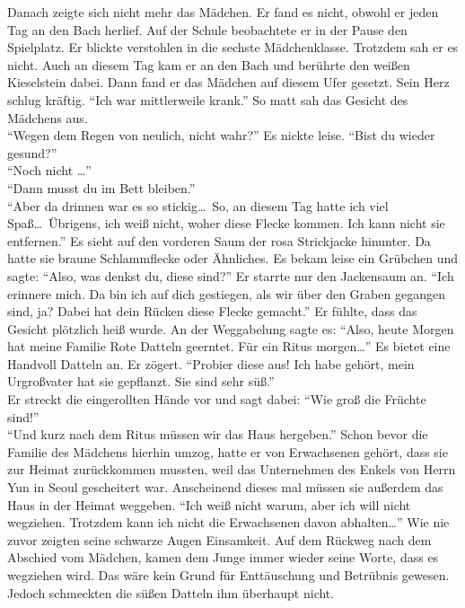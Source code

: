 \documentclass[prd,12pt,tightenlines,notitlepage,nofootinbib]{revtex4-1}
\begin{document}
Danach zeigte sich nicht mehr das Mädchen.
Er fand es nicht, obwohl er jeden Tag an den Bach herlief.
Auf der Schule beobachtete er in der Pause den Spielplatz.
Er blickte verstohlen in die sechste Mädchenklasse.
Trotzdem sah er es nicht.
Auch an diesem Tag kam er an den Bach und berührte
den weißen Kieselstein dabei.
Dann fand er das Mädchen auf diesem Ufer gesetzt.
Sein Herz schlug kräftig.
"`Ich war mittlerweile krank."'
So matt sah das Gesicht des Mädchens aus.
\\ "`Wegen dem Regen von neulich, nicht wahr?"'
Es nickte leise.
"`Bist du wieder gesund?"'
\\ "`Noch nicht \ldots"'
\\ "`Dann musst du im Bett bleiben."'
\\ "`Aber da drinnen war es so stickig\ldots\
So, an diesem Tag hatte ich viel Spaß\ldots\
Übrigens, ich weiß nicht, woher diese Flecke kommen.
Ich kann nicht sie entfernen."'
Es sieht auf den vorderen Saum der rosa Strickjacke hinunter.
Da hatte sie braune Schlammflecke oder Ähnliches.
Es bekam leise ein Grübchen und sagte:
"`Also, was denkst du, diese sind?"'
Er starrte nur den Jackensaum an.
"`Ich erinnere mich.
Da bin ich auf dich gestiegen,
als wir über den Graben gegangen sind, ja?
Dabei hat dein Rücken diese Flecke gemacht."'
Er fühlte, dass das Gesicht plötzlich heiß wurde.
An der Weggabelung sagte es:
"`Also, heute Morgen hat meine Familie Rote Datteln geerntet.
Für ein Ritus morgen\ldots"'
Es bietet eine Handvoll Datteln an.
Er zögert.
"`Probier diese aus!
Ich habe gehört, mein Urgroßvater hat sie gepflanzt.
Sie sind sehr süß."'
\\ Er streckt die eingerollten Hände vor und sagt dabei:
"`Wie groß die Früchte sind!"'
\\ "`Und kurz nach dem Ritus müssen wir das Haus hergeben."'
Schon bevor die Familie des Mädchens hierhin umzog,
hatte er von Erwachsenen gehört,
dass sie zur Heimat zurückkommen mussten,
weil das Unternehmen des Enkels von Herrn Yun in Seoul gescheitert war.
Anscheinend dieses mal müssen sie außerdem das Haus in der Heimat weggeben.
"`Ich weiß nicht warum, aber ich will nicht wegziehen.
Trotzdem kann ich nicht die Erwachsenen davon abhalten\ldots"'
Wie nie zuvor zeigten seine schwarze Augen Einsamkeit.
Auf dem Rückweg nach dem Abschied vom Mädchen,
kamen dem Junge immer wieder seine Worte, dass es wegziehen wird.
Das wäre kein Grund für Enttäuschung und Betrübnis gewesen.
Jedoch schmeckten die süßen Datteln ihm überhaupt nicht.
\end{document}
